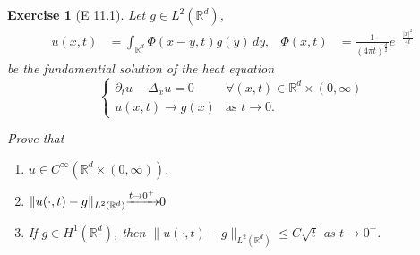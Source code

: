 \documentclass{report}
\theoremstyle{tommy}
\newtheorem{ex}[defn]{Exercise}
\begin{document}
\begin{ex}[E 11.1]
  Let \(g \in L^2(\mathbb{R}^d)\), 
  \begin{align*}
    u(x,t) &= \int_{\mathbb{R}^d} \Phi(x-y, t)g(y) \, dy,&
    \Phi(x,t) &= \frac{1}{(4\pi t)^{\frac{d}{2}}} e^{- \frac{|x|^2}{4t}}
  \end{align*}
  be the fundamential solution of the heat equation
  \[\begin{cases}
    \partial_t u - \Delta_x u = 0 &\forall (x,t) \in \mathbb{R}^d \times (0,\infty) \\ u(x,t) \to g(x) &\text{as } t \to 0.
  \end{cases}\]
  
  Prove that
  \begin{enumerate}[label=\alph*)]
    \item \(u \in C^\infty(\mathbb{R}^d \times (0, \infty))\).
    \item \(\|u(\cdot, t) - g\|_{L^2(\mathbb{R}^d)} \smash{\xrightarrow{t \to 0^+}} 0\)
    \item If \(g \in H^1(\mathbb{R}^d)\), then \(\|u(\cdot, t) -g\|_{L^2(\mathbb{R}^d)} \le C \sqrt{t}\) as \(t \to 0^+\).
  \end{enumerate}
\end{ex}
\end{document}

